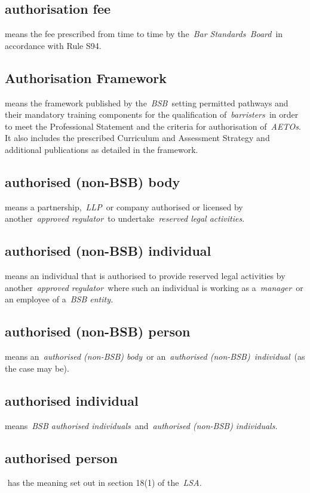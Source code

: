    \subsection{authorisation fee } means the fee prescribed from time to
  time by the~\emph{Bar Standards~Board}~in accordance with Rule S94.  \subsection{Authorisation Framework } means the framework published by
  the~\emph{BSB~}setting permitted pathways and their mandatory training
  components for the qualification of~\emph{barristers~}in order to meet
  the Professional Statement and the criteria for authorisation
  of~\emph{AETOs}. It also includes the prescribed Curriculum and
  Assessment Strategy and additional publications as detailed in the
  framework.  \subsection{authorised (non-BSB) body } means a
  partnership,~\emph{LLP~}or company authorised or licensed by
  another~\emph{approved regulator~}to undertake~\emph{reserved legal
  activities.} \subsection{authorised (non-BSB) individual } means an individual that is
  authorised to provide reserved legal activities by
  another~\emph{approved regulator~}where such an individual is working
  as a~\emph{manager~}or an employee of a~\emph{BSB entity.} \subsection{authorised (non-BSB) person } means an~\emph{authorised
  (non-BSB) body~}or an~\emph{authorised (non-BSB)~individual}~(as the
  case may be).  \subsection{authorised individual } means~\emph{BSB authorised
  individuals~}and~\emph{authorised (non-BSB) individuals.} \subsection{authorised person } has the meaning set out in section 18(1)
  of the~\emph{LSA.}
  
  
